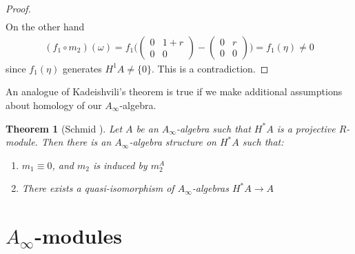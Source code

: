 \documentclass[a4paper, 12pt, openany, fleqn]{amsart}
\newtheorem{theorem}{Theorem}[section]
\begin{document}
\begin{proof}
\begin{align*}
    \end{align*}
    On the other hand
    \begin{align*}
        (f_1\circ m_2)(\omega) = f_1\Biggl(\begin{pmatrix}
            0 & 1+r\\
            0 & 0
        \end{pmatrix} - \begin{pmatrix}
            0 & r\\
            0 & 0
        \end{pmatrix}\Biggl) = f_1(\eta) \neq 0
    \end{align*}
    since $f_1(\eta)$ generates $H^1A \neq \{0\}$. This is a contradiction.
\end{proof}
An analogue of Kadeishvili's theorem is true if we make additional assumptions about homology of our $A_\infty$-algebra.
\begin{theorem}[Schmid \cite{A-infty_rings}]
    Let $A$ be an $A_\infty$-algebra such that $H^*A$ is a projective $R$-module. Then there is an $A_\infty$-algebra structure on $H^*A$ such that:
    \begin{enumerate}
        \item $m_1\equiv0$, and $m_2$ is induced by $m_2^A$
        \item There exists a quasi-isomorphism of $A_\infty$-algebras $H^*A\longrightarrow A$
    \end{enumerate}
\end{theorem}
\section{$A_\infty$-modules}
\end{document}
